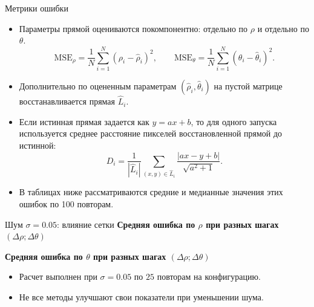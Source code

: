 \documentclass[unicode,notheorems]{beamer}
\begin{document}
\begin{frame}{Метрики ошибки}
	\footnotesize
	\begin{itemize}
		\setlength{\itemsep}{0.25em}
		\item Параметры прямой оцениваются покомпонентно: отдельно по $\rho$ и отдельно по $\theta$.
		\[
		\mathrm{MSE}_{\rho} = \frac{1}{N}\sum_{i=1}^{N}(\rho_i-\hat{\rho}_i)^2,
		\qquad
		\mathrm{MSE}_{\theta} = \frac{1}{N}\sum_{i=1}^{N}(\theta_i-\hat{\theta}_i)^2.
		\]
		\item Дополнительно по оцененным параметрам $(\hat\rho_i,\hat\theta_i)$ на пустой матрице восстанавливается прямая $\widehat L_i$.
		\item Если истинная прямая задается как $y=ax+b$, то для одного запуска используется среднее расстояние пикселей восстановленной прямой до истинной:
		\[
			D_i=\frac{1}{|\widehat L_i|}\sum_{(x,y)\in \widehat L_i}
			\frac{|ax-y+b|}{\sqrt{a^2+1}}.
		\]
		\item В таблицах ниже рассматриваются средние и медианные значения этих ошибок по 100 повторам.
	\end{itemize}
\end{frame}

\begin{frame}{Шум $\sigma=0.05$: влияние сетки}
	\scriptsize
	\centering
	\textbf{Средняя ошибка по $\rho$ при разных шагах $(\Delta\rho;\Delta\theta)$}
	\par\vspace{0.06cm}
	{
	\renewcommand{\arraystretch}{0.9}
	\setlength{\tabcolsep}{2pt}
	\resizebox{0.82\textwidth}{!}{}
	}

	\vspace{0.18cm}
	\textbf{Средняя ошибка по $\theta$ при разных шагах $(\Delta\rho;\Delta\theta)$}
	\par\vspace{0.06cm}
	{
	\renewcommand{\arraystretch}{0.9}
	\setlength{\tabcolsep}{2pt}
	\resizebox{0.82\textwidth}{!}{}
	}

	\vspace{0.12cm}
	\begin{itemize}
		\setlength{\itemsep}{0pt}
		\item Расчет выполнен при $\sigma=0.05$ по $25$ повторам на конфигурацию.
		\item Не все методы улучшают свои показатели при уменьшении шума.
	\end{itemize}
\end{frame}
\end{document}

